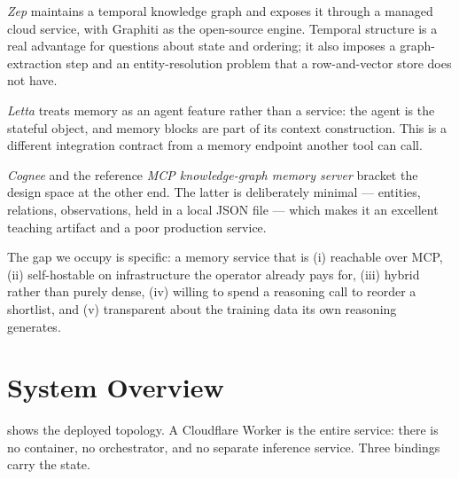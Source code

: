 \documentclass[10pt,twocolumn]{article}
\begin{document}
\emph{Zep} \citep{zep2025} maintains a temporal knowledge graph and exposes it
through a managed cloud service, with Graphiti as the open-source engine.
Temporal structure is a real advantage for questions about state and ordering;
it also imposes a graph-extraction step and an entity-resolution problem that a
row-and-vector store does not have.

\emph{Letta} \citep{letta2025} treats memory as an agent feature rather than a
service: the agent is the stateful object, and memory blocks are part of its
context construction. This is a different integration contract from a memory
endpoint another tool can call.

\emph{Cognee} and the reference \emph{MCP knowledge-graph memory server}
\citep{mcpserver2025} bracket the design space at the other end. The latter is
deliberately minimal --- entities, relations, observations, held in a local JSON
file --- which makes it an excellent teaching artifact and a poor production
service.

The gap we occupy is specific: a memory service that is (i) reachable over MCP,
(ii) self-hostable on infrastructure the operator already pays for, (iii) hybrid
rather than purely dense, (iv) willing to spend a reasoning call to reorder a
shortlist, and (v) transparent about the training data its own reasoning
generates.

\section{System Overview}
\label{sec:system}

 shows the deployed topology. A Cloudflare Worker is the entire
service: there is no container, no orchestrator, and no separate inference
service. Three bindings carry the state.
\end{document}
